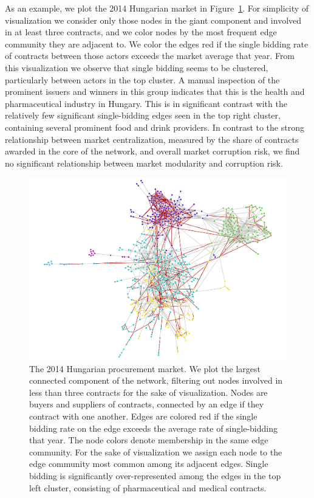 As an example, we plot the 2014 Hungarian market in Figure~\ref{fig:hu2014_edgecluster}. For simplicity of visualization we consider only those nodes in the giant component and involved in at least three contracts, and we color nodes by the most frequent edge community they are adjacent to. We color the edges red if the single bidding rate of contracts between those actors exceeds the market average that year. From this visualization we observe that single bidding seems to be clustered, particularly between actors in the top cluster. A manual inspection of the prominent issuers and winners in this group indicates that this is the health and pharmaceutical industry in Hungary. This is in significant contrast with the relatively few significant single-bidding edges seen in the top right cluster, containing several prominent food and drink providers. In contrast to the strong relationship between market centralization, measured by the share of contracts awarded in the core of the network, and overall market corruption risk, we find no significant relationship between market modularity and corruption risk.


\begin{figure}
\centering
  \includegraphics[width=\textwidth]{images/ted_networks/hu_2014_edge_clustered_sb.pdf}
  \caption[2014 Hungarian Procurement Market with Edge Communities]{The 2014 Hungarian procurement market. We plot the largest connected component of the network, filtering out nodes involved in less than three contracts for the sake of visualization. Nodes are buyers and suppliers of contracts, connected by an edge if they contract with one another. Edges are colored red if the single bidding rate on the edge exceeds the average rate of single-bidding that year. The node colors denote membership in the same edge community. For the sake of visualization we assign each node to the edge community most common among its adjacent edges. Single bidding is significantly over-represented among the edges in the top left cluster, consisting of pharmaceutical and medical contracts.}
  \label{fig:hu2014_edgecluster}
\end{figure}


